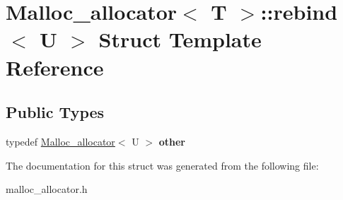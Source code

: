 \hypertarget{structMalloc__allocator_1_1rebind}{}\section{Malloc\+\_\+allocator$<$ T $>$\+:\+:rebind$<$ U $>$ Struct Template Reference}
\label{structMalloc__allocator_1_1rebind}
\subsection*{Public Types}
\begin{DoxyCompactItemize}
\item 
\mbox{\label{structMalloc__allocator_1_1rebind_a478dc41a32eb53e01e7f980e4496e079}} 
typedef \mbox{\hyperlink{classMalloc__allocator}{Malloc\+\_\+allocator}}$<$ U $>$ {\bfseries other}
\end{DoxyCompactItemize}


The documentation for this struct was generated from the following file\+:\begin{DoxyCompactItemize}
\item 
malloc\+\_\+allocator.\+h\end{DoxyCompactItemize}
